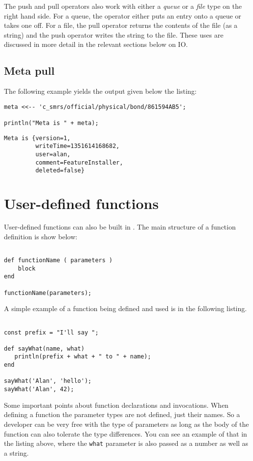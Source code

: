 The push and pull operators also work with either a \emph{queue} or a \emph{file} type on the right hand side. For a queue, the operator either puts an entry onto a \Rapture queue or takes one off. For a file, the pull operator returns the contents of the file (as a string) and the push operator writes the string to the file. These uses are discussed in more detail in the relevant sections below on IO.

\section{Meta pull}

The following example yields the output given below the listing:
\begin{lstlisting}[caption={Meta pull}]
meta <<-- 'c_smrs/official/physical/bond/861594AB5';

println("Meta is " + meta);
\end{lstlisting}

\begin{Verbatim}
Meta is {version=1, 
         writeTime=1351614168682, 
         user=alan, 
         comment=FeatureInstaller, 
         deleted=false}
\end{Verbatim}


\chapter{User-defined functions}
User-defined functions  can also be built in \Reflex. The main structure of a function definition is show below:
\begin{Verbatim}

def functionName ( parameters )
    block
end

functionName(parameters);

\end{Verbatim}
A simple example of a function being defined and used is in the following listing.

\begin{lstlisting}[caption={Function definition}]

const prefix = "I'll say ";

def sayWhat(name, what) 
   println(prefix + what + " to " + name);
end

sayWhat('Alan', 'hello');
sayWhat('Alan', 42);

\end{lstlisting}

Some important points about function declarations and invocations. When defining a function the parameter types are not defined, just their names. So a developer can be very free with the type of parameters as long as the body of the function can also tolerate the type differences. You can see an example of that in the listing above, where the \Verb+what+ parameter is also passed as a number as well as a string.

